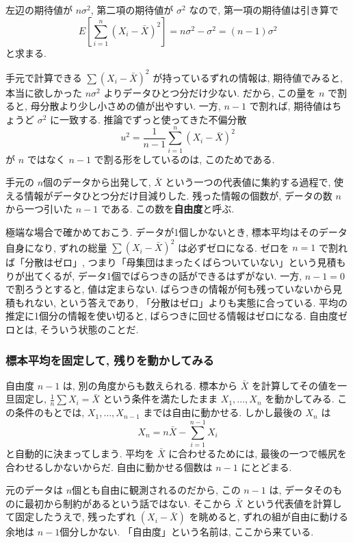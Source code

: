     左辺の期待値が $n\sigma^2$, 第二項の期待値が $\sigma^2$ なので, 第一項の期待値は引き算で
    \[
      E\!\left[\sum_{i=1}^n (X_i - \bar{X})^2\right] = n\sigma^2 - \sigma^2 = (n-1)\sigma^2
    \]
    と求まる.

    手元で計算できる $\sum(X_i - \bar{X})^2$ が持っているずれの情報は, 期待値でみると, 本当に欲しかった $n\sigma^2$ よりデータひとつ分だけ少ない.
    だから, この量を $n$ で割ると, 母分散より少し小さめの値が出やすい.
    一方, $n-1$ で割れば, 期待値はちょうど $\sigma^2$ に一致する.
    推論でずっと使ってきた不偏分散
    \[
      u^2 = \frac{1}{n-1} \sum_{i=1}^n (X_i - \bar{X})^2
    \]
    が $n$ ではなく $n-1$ で割る形をしているのは, このためである.

    手元の $n$個のデータから出発して, $\bar{X}$ という一つの代表値に集約する過程で, 使える情報がデータひとつ分だけ目減りした.
    残った情報の個数が, データの数 $n$ から一つ引いた $n-1$ である.
    この数を\textbf{自由度}と呼ぶ.

    極端な場合で確かめておこう.
    データが1個しかないとき, 標本平均はそのデータ自身になり, ずれの総量 $\sum(X_i - \bar{X})^2$ は必ずゼロになる.
    ゼロを $n = 1$ で割れば「分散はゼロ」, つまり「母集団はまったくばらついていない」という見積もりが出てくるが, データ1個でばらつきの話ができるはずがない.
    一方, $n - 1 = 0$ で割ろうとすると, 値は定まらない.
    ばらつきの情報が何も残っていないから見積もれない, という答えであり, 「分散はゼロ」よりも実態に合っている.
    平均の推定に1個分の情報を使い切ると, ばらつきに回せる情報はゼロになる. 自由度ゼロとは, そういう状態のことだ.

    \subsubsection*{標本平均を固定して, 残りを動かしてみる}

    自由度 $n-1$ は, 別の角度からも数えられる.
    標本から $\bar{X}$ を計算してその値を一旦固定し, $\frac{1}{n}\sum X_i = \bar{X}$ という条件を満たしたまま $X_1, \ldots, X_n$ を動かしてみる.
    この条件のもとでは, $X_1, \ldots, X_{n-1}$ までは自由に動かせる.
    しかし最後の $X_n$ は
    \[
      X_n = n\bar{X} - \sum_{i=1}^{n-1} X_i
    \]
    と自動的に決まってしまう.
    平均を $\bar{X}$ に合わせるためには, 最後の一つで帳尻を合わせるしかないからだ.
    自由に動かせる個数は $n-1$ にとどまる.

    元のデータは $n$個とも自由に観測されるのだから, この $n-1$ は, データそのものに最初から制約があるという話ではない.
    そこから $\bar{X}$ という代表値を計算して固定したうえで, 残ったずれ $(X_i - \bar{X})$ を眺めると, ずれの組が自由に動ける余地は $n-1$個分しかない.
    「自由度」という名前は, ここから来ている.


